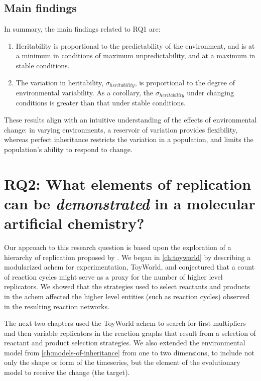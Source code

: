 \subsection{Main findings}

In summary, the main findings related to RQ1 are:

\begin{enumerate}
\item Heritability is proportional to the predictability of the environment, and is at a minimum in conditions of maximum unpredictability, and at a maximum in stable conditions.
\item The variation in heritability, $\sigma_{heritability}$, is proportional to the degree of environmental variability. As a corollary, the $\sigma_{heritability}$ under changing conditions is greater than that under stable conditions.
\end{enumerate}

These results align with an intuitive understanding of the effects of environmental change: in varying environments, a reservoir of variation provides flexibility, whereas perfect inheritance restricts the variation in a population, and limits the population's ability to respond to change. 

\section{RQ2: What elements of replication can be \emph{demonstrated} in a molecular artificial chemistry?}

Our approach to this research question is based upon the exploration of a hierarchy of replication proposed by \textcite{Zachar2010}. We began in \cref{ch:toyworld} by describing a modularized \gls{achem} for experimentation, ToyWorld, and conjectured that a count of reaction cycles might serve as a proxy for the number of higher level replicators. We showed that the strategies used to select reactants and products in the \gls{achem} affected the higher level entities (such as reaction cycles) observed in the resulting reaction networks. 

The next two chapters used the ToyWorld \gls{achem} to search for first multipliers and then variable replicators in the reaction graphs that result from a selection of reactant and product selection strategies. We also extended the environmental model from \cref{ch:models-of-inheritance} from one to two dimensions, to include not only the shape or form of the timeseries, but the element of the evolutionary model to receive the change (the target). 

